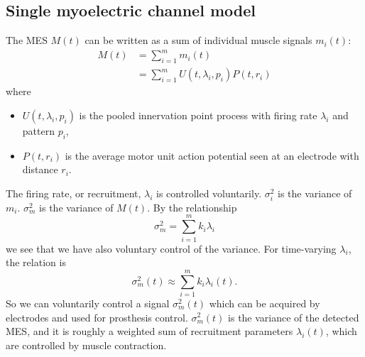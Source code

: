 \subsection{Single myoelectric channel model}
The MES $M(t)$ can be written as a sum of individual muscle signals $m_i(t)$:
\begin{equation}
\begin{split}
    M(t) &= \sum_{i=1}^{m} m_i(t) \\
         &= \sum_{i=1}^{m} U(t,\lambda_i,p_i) P(t,r_i)
\end{split}
\end{equation}
where
\begin{itemize}
    \item $U(t,\lambda_i,p_i)$ is the pooled innervation point process with firing rate $\lambda_i$ and pattern $p_i$,
    \item $P(t,r_i)$ is the average motor unit action potential seen at an electrode with distance $r_i$.
\end{itemize}
The firing rate, or recruitment, $\lambda_i$ is controlled voluntarily. $\sigma_i^2$ is the variance of $m_i$. $\sigma_m^2$ is the variance of $M(t)$. By the relationship
\begin{equation}
    \sigma_m^2 = \sum_{i=1}^{m} k_i \lambda_i
\end{equation}
we see that we have also voluntary control of the variance. For time-varying $\lambda_i$, the relation is
\begin{equation}
    \sigma_m^2(t) \approx \sum_{i=1}^{m} k_i \lambda_i(t).
\end{equation}
So we can voluntarily control a signal $\sigma_m^2(t)$ which can be acquired by electrodes and used for prosthesis control. $\sigma_m^2(t)$ is the variance of the detected MES, and it is roughly a weighted sum of recruitment parameters $\lambda_i(t)$, which are controlled by muscle contraction.
